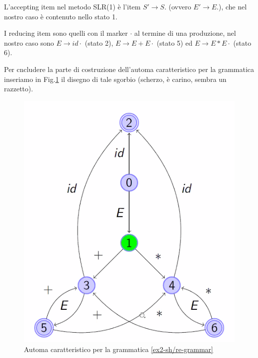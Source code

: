 \documentclass[class=book, crop=false, oneside, 12pt]{standalone}
\begin{document}
L'accepting item nel metodo SLR(1) è l'item \(S' \to S.\) (ovvero \(E' \to E.\)), che nel nostro caso è contenuto nello stato 1.

I reducing item sono quelli con il marker \(\cdot\) al termine di una produzione, nel nostro caso sono \(E \to id \cdot\) (stato 2), \(E \to E+E \cdot\) (stato 5) ed \(E \to E*E \cdot\) (stato 6).

Per cncludere la parte di costruzione dell'automa caratteristico per la grammatica inseriamo in Fig.\ref{ex2-sh/re-automata} il disegno di tale sgorbio (scherzo, è carino, sembra un razzetto).
\begin{figure}
    \center
    \includegraphics[width=.6\textwidth]{ex2-sh_re-automata.png}
    \caption{Automa caratteristico per la grammatica \ref{ex2-sh/re-grammar}}
    \label{ex2-sh/re-automata}
\end{figure}
\end{document}
